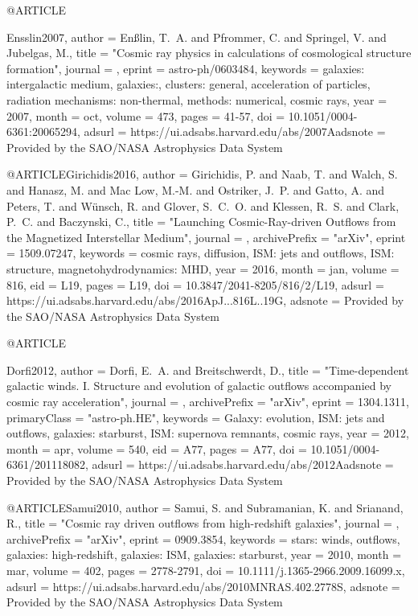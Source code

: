\documentclass[useAMS,usenatbib]{mnras}
\begin{document}
{{{{{{{@ARTICLE{Ensslin2007,
   author = {{En{\ss}lin}, T.~A. and {Pfrommer}, C. and {Springel}, V. and 
	{Jubelgas}, M.},
    title = "{Cosmic ray physics in calculations of cosmological structure formation}",
  journal = {\aap},
   eprint = {astro-ph/0603484},
 keywords = {galaxies: intergalactic medium, galaxies:, clusters: general, acceleration of particles, radiation mechanisms: non-thermal, methods: numerical, cosmic rays},
     year = 2007,
    month = oct,
   volume = 473,
    pages = {41-57},
      doi = {10.1051/0004-6361:20065294},
   adsurl = {https://ui.adsabs.harvard.edu/abs/2007Aadsnote = {Provided by the SAO/NASA Astrophysics Data System}
}

@ARTICLE{Girichidis2016,
   author = {{Girichidis}, P. and {Naab}, T. and {Walch}, S. and {Hanasz}, M. and 
	{Mac Low}, M.-M. and {Ostriker}, J.~P. and {Gatto}, A. and {Peters}, T. and 
	{W{\"u}nsch}, R. and {Glover}, S.~C.~O. and {Klessen}, R.~S. and 
	{Clark}, P.~C. and {Baczynski}, C.},
    title = "{Launching Cosmic-Ray-driven Outflows from the Magnetized Interstellar Medium}",
  journal = {\apjl},
archivePrefix = "arXiv",
   eprint = {1509.07247},
 keywords = {cosmic rays, diffusion, ISM: jets and outflows, ISM: structure, magnetohydrodynamics: MHD},
     year = 2016,
    month = jan,
   volume = 816,
      eid = {L19},
    pages = {L19},
      doi = {10.3847/2041-8205/816/2/L19},
   adsurl = {https://ui.adsabs.harvard.edu/abs/2016ApJ...816L..19G},
  adsnote = {Provided by the SAO/NASA Astrophysics Data System}
}

@ARTICLE{Dorfi2012,
   author = {{Dorfi}, E.~A. and {Breitschwerdt}, D.},
    title = "{Time-dependent galactic winds. I. Structure and evolution of galactic outflows accompanied by cosmic ray acceleration}",
  journal = {\aap},
archivePrefix = "arXiv",
   eprint = {1304.1311},
 primaryClass = "astro-ph.HE",
 keywords = {Galaxy: evolution, ISM: jets and outflows, galaxies: starburst, ISM: supernova remnants, cosmic rays},
     year = 2012,
    month = apr,
   volume = 540,
      eid = {A77},
    pages = {A77},
      doi = {10.1051/0004-6361/201118082},
   adsurl = {https://ui.adsabs.harvard.edu/abs/2012Aadsnote = {Provided by the SAO/NASA Astrophysics Data System}
}

@ARTICLE{Samui2010,
   author = {{Samui}, S. and {Subramanian}, K. and {Srianand}, R.},
    title = "{Cosmic ray driven outflows from high-redshift galaxies}",
  journal = {\mnras},
archivePrefix = "arXiv",
   eprint = {0909.3854},
 keywords = {stars: winds, outflows, galaxies: high-redshift, galaxies: ISM, galaxies: starburst},
     year = 2010,
    month = mar,
   volume = 402,
    pages = {2778-2791},
      doi = {10.1111/j.1365-2966.2009.16099.x},
   adsurl = {https://ui.adsabs.harvard.edu/abs/2010MNRAS.402.2778S},
  adsnote = {Provided by the SAO/NASA Astrophysics Data System}
}

}}}}}}}}}
\end{document}
